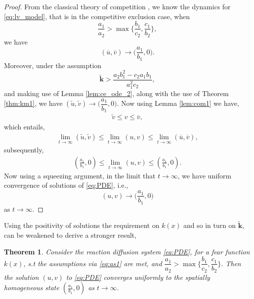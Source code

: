 \documentclass[10pt]{amsart}
\newtheorem{theorem}{Theorem}[section]
\theoremstyle{definition}
\begin{document}
\begin{proof}
%	
%	
	From the classical theory of competition \cite{Murray93}, we know the dynamics for \eqref{eq:lv_model}, that is in the competitive exclusion case, when
	\[  \dfrac{a_1}{a_2} > \max \Big\{ \dfrac{b_1}{c_2},\dfrac{c_1}{b_2}  \Big \} , \]
	we have 
	\[ (\overline{u},\overline{v}) \to \Big(\dfrac{a_1}{b_1},0\Big).\]
	Moreover, under the assumption 
	\[ \mathbf{\widetilde{k} }>\dfrac{a_2 b_1^2-c_2a_1b_1}{a_1^2c_2}, \]
	and making use of Lemma \ref{lem:ce_ode_2}, along with the use of Theorem \ref{thm:km1}, we have
	$(\widetilde{u},\widetilde{v}) \to \Big(\dfrac{a_1}{b_1},0\Big)$. Now using Lemma \ref{lem:com1} we have,
	\begin{align*}
	 \widetilde{v}	 \leq   v    \leq \overline{v},
	\end{align*}
	 which entails,
	\begin{align*}
	\lim_{t \rightarrow \infty}(\widetilde{u}, \widetilde{v})	 \leq  \lim_{t \rightarrow \infty} (u,v)    \leq \lim_{t \rightarrow \infty} (\overline{u},\overline{v}),
	\end{align*}
	subsequently,
	\begin{align*}
		\left(\frac{a_{1}}{b_{1}},0\right)	 \leq  \lim_{t \rightarrow \infty}   (u,v)    \leq 	\left(\frac{a_{1}}{b_{1}},0\right).
	\end{align*}
	Now using a squeezing argument, in the limit that $t \rightarrow \infty$, we have uniform convergence of solutions of \eqref{eq:PDE}, i.e.,
	\[ (u,v) \to \Big(\dfrac{a_1}{b_1},0\Big)  \] as $t \rightarrow \infty$.
\end{proof}

Using the positivity of solutions the requirement on $k(x)$ and so in turn on $\mathbf{\widetilde{k} }$, can be weakened to derive a stronger result,

\begin{theorem}\label{thm:ce_1_pde22}
	Consider the reaction diffusion system \eqref{eq:PDE}, for a fear function $k(x)$, s.t the assumptions via \eqref{eq:as1} are met, and $\dfrac{a_1}{a_2} > \max \Big\{ \dfrac{b_1}{c_2},\dfrac{c_1}{b_2}  \Big\}$.
	Then the solution $(u,v)$ to \eqref{eq:PDE} converges uniformly to the spatially homogeneous state $(\frac{a_{1}}{b_{1}},0)$ as $t \to \infty$.
\end{theorem}
\end{document}
